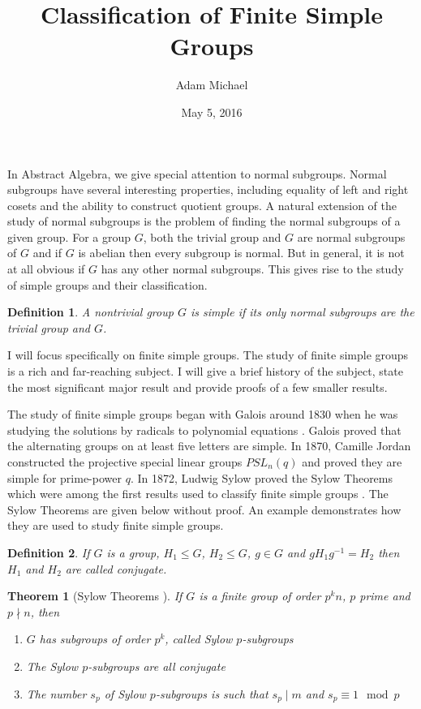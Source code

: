 \documentclass[a4paper]{article}
\title{Classification of Finite Simple Groups}
\author{Adam Michael}
\date{May 5, 2016}
\begin{document}
\maketitle

\newtheorem{theorem}{Theorem}
\newtheorem{lemma}{Lemma}
\newtheorem{definition}{Definition}
\newtheorem{example}{Example}

In Abstract Algebra, we give special attention to normal subgroups. Normal subgroups have several interesting properties, including equality of left and right cosets and the ability to construct quotient groups. A natural extension of the study of normal subgroups is the problem of finding the normal subgroups of a given group. For a group $G$, both the trivial group and $G$ are normal subgroups of $G$ and if $G$ is abelian then every subgroup is normal. But in general, it is not at all obvious if $G$ has any other normal subgroups. This gives rise to the study of simple groups and their classification.

\begin{definition}
A nontrivial group $G$ is simple if its only normal subgroups are the trivial group and $G$.
\end{definition}

I will focus specifically on finite simple groups. The study of finite simple groups is a rich and far-reaching subject. I will give a brief history of the subject, state the most significant major result and provide proofs of a few smaller results.

The study of finite simple groups began with Galois around 1830 when he was studying the solutions by radicals to polynomial equations \cite{gallian}. Galois proved that the alternating groups on at least five letters are simple. In 1870, Camille Jordan constructed the projective special linear  groups $PSL_n(q)$ and proved they are simple for prime-power $q$. In 1872, Ludwig Sylow proved the Sylow Theorems which were among the first results used to classify finite simple groups \cite{wilson}. The Sylow Theorems are given below without proof. An example demonstrates how they are used to study finite simple groups.

\begin{definition}
If $G$ is a group, $H_1 \le G$, $H_2 \le G$, $g \in G$ and $g H_1 g^{-1} = H_2$ then $H_1$ and $H_2$ are called conjugate.
\end{definition}

\begin{theorem}[Sylow Theorems \cite{wilson}]
If $G$ is a finite group of order $p^k n$, $p$ prime and $p \nmid n$, then
\begin{enumerate}
	\item $G$ has subgroups of order $p^k$, called Sylow $p$-subgroups
	\item The Sylow $p$-subgroups are all conjugate
	\item The number $s_p$ of Sylow $p$-subgroups is such that $s_p \mid m$ and $s_p \equiv 1 \mod p$	
\end{enumerate}
\end{theorem}
\end{document}
